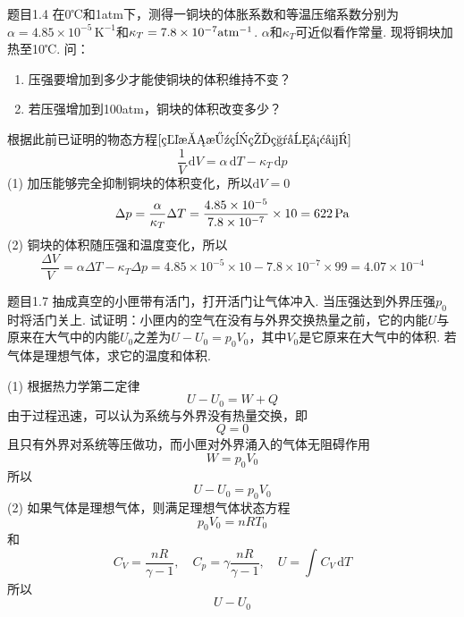 \begin{question}{题目1.4}
    在0℃和1atm下，测得一铜块的体胀系数和等温压缩系数分别为$\alpha=4.85\times10^{-5}\,\mathrm{K^{-1}}$和$\kappa_T=7.8\times10^{-7}\rm{atm^{-1}}$. $\alpha$和$\kappa_T$可近似看作常量. 现将铜块加热至10℃. 问：
    \begin{enumerate}
        \item 压强要增加到多少才能使铜块的体积维持不变？
        \item 若压强增加到100atm，铜块的体积改变多少？
    \end{enumerate}
\end{question}
\begin{solution}
    根据此前已证明的物态方程$\eqref{物态方程的积分形式}$
    \begin{equation}\label{物态方程的微分形式}
        \frac{1}{V}\,\mathrm{d}V=\alpha\,\mathrm{d}T-\kappa_T\,\mathrm{d}p
    \end{equation}
    (1) 加压能够完全抑制铜块的体积变化，所以$\mathrm{d}V=0$
    $$
        \Delta{p}
        =\frac{\alpha}{\kappa_T}\Delta{T}
        =\frac{4.85\times 10^{-5}}{7.8\times 10^{-7}}\times 10
        =622 {\,\rm Pa}
    $$
    (2) 铜块的体积随压强和温度变化，所以
    $$
        \frac{\Delta{V}}{V}
        =\alpha\Delta{T}-\kappa_T\Delta{p}
        =4.85 \times 10^{-5} \times 10 - 7.8 \times 10^{-7} \times 99
        =4.07 \times 10^{-4}
    $$
\end{solution}


\begin{question}{题目1.7}
    抽成真空的小匣带有活门，打开活门让气体冲入. 当压强达到外界压强$p_0$时将活门关上. 试证明：小匣内的空气在没有与外界交换热量之前，它的内能$U$与原来在大气中的内能$U_0$之差为$U-U_0=p_0V_0$，其中$V_0$是它原来在大气中的体积. 若气体是理想气体，求它的温度和体积.
\end{question}
\begin{solution}
    (1) 根据热力学第二定律
    $$
        U-U_0=W+Q
    $$
    由于过程迅速，可以认为系统与外界没有热量交换，即
    $$
        Q=0
    $$
    且只有外界对系统等压做功，而小匣对外界涌入的气体无阻碍作用
    $$
        W=p_0V_0
    $$
    所以
    $$
        U-U_0=p_0V_0
    $$
    (2) 如果气体是理想气体，则满足理想气体状态方程
    $$
        p_0V_0=nRT_0
    $$
    和
    $$
        C_V=\frac{nR}{\gamma-1}, \quad C_p=\gamma\frac{nR}{\gamma-1}, \quad U=\int_{}^{}C_V\,\mathrm{d}T
    $$
    所以
    $$
        U-U_0
    $$
\end{solution}


